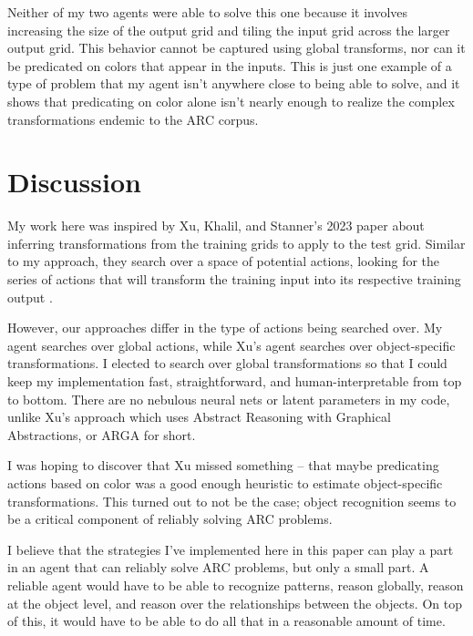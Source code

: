 \documentclass[letterpaper]{article} %
\begin{document}
Neither of my two agents were able to solve this one because it involves increasing the size of the output grid and tiling the input grid across the larger output grid. This behavior cannot be captured using global transforms, nor can it be predicated on colors that appear in the inputs. This is just one example of a type of problem that my agent isn't anywhere close to being able to solve, and it shows that predicating on color alone isn't nearly enough to realize the complex transformations endemic to the ARC corpus.


\section{Discussion}
My work here was inspired by Xu, Khalil, and Stanner's 2023 paper about inferring transformations from the training grids to apply to the test grid. Similar to my approach, they search over a space of potential actions, looking for the series of actions that will transform the training input into its respective training output \cite{Xu_Khalil_Sanner_2023}.

\bigskip

However, our approaches differ in the type of actions being searched over. My agent searches over global actions, while Xu's agent searches over object-specific transformations. I elected to search over global transformations so that I could keep my implementation fast, straightforward, and human-interpretable from top to bottom. There are no nebulous neural nets or latent parameters in my code, unlike Xu's approach which uses Abstract Reasoning with Graphical Abstractions, or ARGA for short.

\bigskip

I was hoping to discover that Xu missed something -- that maybe predicating actions based on color was a good enough heuristic to estimate object-specific transformations. This turned out to not be the case; object recognition seems to be a critical component of reliably solving ARC problems.

\bigskip

I believe that the strategies I've implemented here in this paper can play a part in an agent that can reliably solve ARC problems, but only a small part. A reliable agent would have to be able to recognize patterns, reason globally, reason at the object level, and reason over the relationships between the objects. On top of this, it would have to be able to do all that in a reasonable amount of time.
\end{document}
